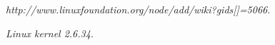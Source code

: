 \documentclass[fontsize=11pt, %
                             paper=a4, %
                             oneside, %
                             captions=tableheading,
                             index=totoc,
                             hyperref]{labbook}
\begin{document}

\begin{thebibliography}{9}

\emph{http://www.linuxfoundation.org/node/add/wiki?gids[]=5066}.

\emph{Linux kernel 2.6.34}.

\end{thebibliography}

\end{document}
